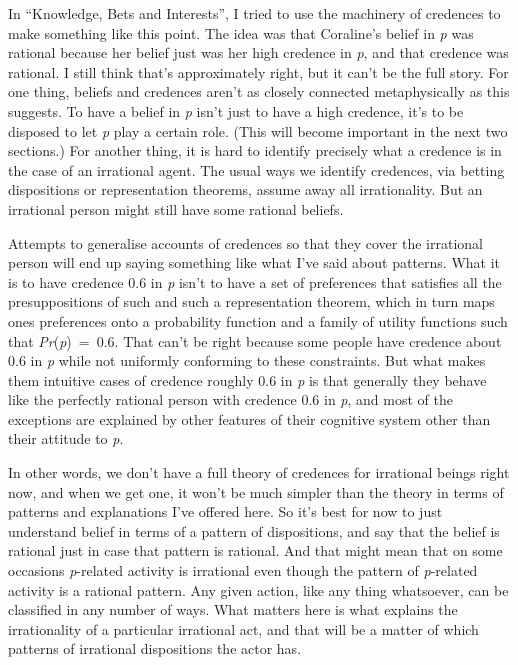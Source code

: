 \documentclass[
  12pt,
  letterpaper,
]{scrbook}
\begin{document}
In ``Knowledge, Bets and Interests'', I tried to use the machinery of
credences to make something like this point. The idea was that
Coraline's belief in \emph{p} was rational because her belief just was
her high credence in \emph{p}, and that credence was rational. I still
think that's approximately right, but it can't be the full story. For
one thing, beliefs and credences aren't as closely connected
metaphysically as this suggests. To have a belief in \emph{p} isn't just
to have a high credence, it's to be disposed to let \emph{p} play a
certain role. (This will become important in the next two sections.) For
another thing, it is hard to identify precisely what a credence is in
the case of an irrational agent. The usual ways we identify credences,
via betting dispositions or representation theorems, assume away all
irrationality. But an irrational person might still have some rational
beliefs.

Attempts to generalise accounts of credences so that they cover the
irrational person will end up saying something like what I've said about
patterns. What it is to have credence 0.6 in \emph{p} isn't to have a
set of preferences that satisfies all the presuppositions of such and
such a representation theorem, which in turn maps ones preferences onto
a probability function and a family of utility functions such that
\emph{Pr}(\emph{p})~=~0.6. That can't be right because some people have
credence about 0.6 in \emph{p} while not uniformly conforming to these
constraints. But what makes them intuitive cases of credence roughly 0.6
in \emph{p} is that generally they behave like the perfectly rational
person with credence 0.6 in \emph{p}, and most of the exceptions are
explained by other features of their cognitive system other than their
attitude to \emph{p}.

In other words, we don't have a full theory of credences for irrational
beings right now, and when we get one, it won't be much simpler than the
theory in terms of patterns and explanations I've offered here. So it's
best for now to just understand belief in terms of a pattern of
dispositions, and say that the belief is rational just in case that
pattern is rational. And that might mean that on some occasions
\emph{p}-related activity is irrational even though the pattern of
\emph{p}-related activity is a rational pattern. Any given action, like
any thing whatsoever, can be classified in any number of ways. What
matters here is what explains the irrationality of a particular
irrational act, and that will be a matter of which patterns of
irrational dispositions the actor has.
\end{document}
